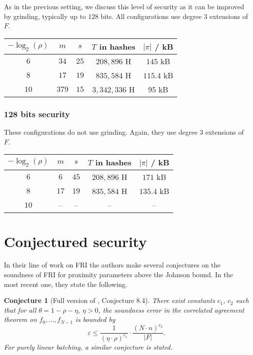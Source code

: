\documentclass[11pt,article,oneside]{memoir}
\newtheorem{conj}[]{Conjecture}
\theoremstyle{definition}
\theoremstyle{remark}
\begin{document}
As in the previous setting, we discuss this level of security as it can be improved by grinding, typically up to $128$ bits. 
All configurations use degree $3$ extensions of $F$.
\begin{center}
\begin{tabular}{|c|c|c|c|c|}
\hline
$-\log_2(\rho)$ & $m$	& $s$	& $T$ in hashes 	& $|\pi|$ / kB
\\\hline\hline
$6$ 	& $34$	& $25$	& $208,896$ H 	& $145$ kB
\\
$8$ & $17$	& $19$	& $835,584$ H & $115.4$ kB
\\
$10$ & $379$	& $15$	& $3,342,336$ H 	& $95$ kB
\\\hline
\end{tabular}
\end{center}

\subsubsection{128 bits security}
These configurations do not use grinding. 
Again, they use degree $3$ extensions of $F$.

\begin{center}
\begin{tabular}{|c|c|c|c|c|}
\hline
$-\log_2(\rho)$ & $m$	& $s$	& $T$ in hashes 	& $|\pi|$ / kB
\\\hline\hline
$6$ 	& $6$	& $45$	& $208,896$ H 	& $171$ kB
\\
$8$ & $17$	& $19$	& $835,584$ H & $135.4$ kB
\\
$10$ & --	& --	& --  	&  --
\\\hline
\end{tabular}
\end{center}


\section{Conjectured security}
\label{s:FRIConjecture}

In their line of work on FRI the authors make several conjectures on the soundness of FRI for proximity parameters above the Johnson bound. 
In the most recent one, they state the following.

\begin{conj}[Full version of \cite{ProximityGaps}, Conjecture 8.4]
\label{con:FRIsoundness}
There exist constants $c_1$, $c_2$ such that for all $\theta =1-\rho -\eta$, $\eta >0$,  the soundness error in the correlated agreement theorem on $f_0,\ldots ,f_{N-1}$ is bounded by
\[
\varepsilon \leq \frac{1}{(\eta\cdot\rho)^{c_1}} \cdot \frac{(N\cdot n)^{c_2}}{|F|}.
\]
For purely linear batching, a similar conjecture is stated.
\end{conj}
\end{document}
